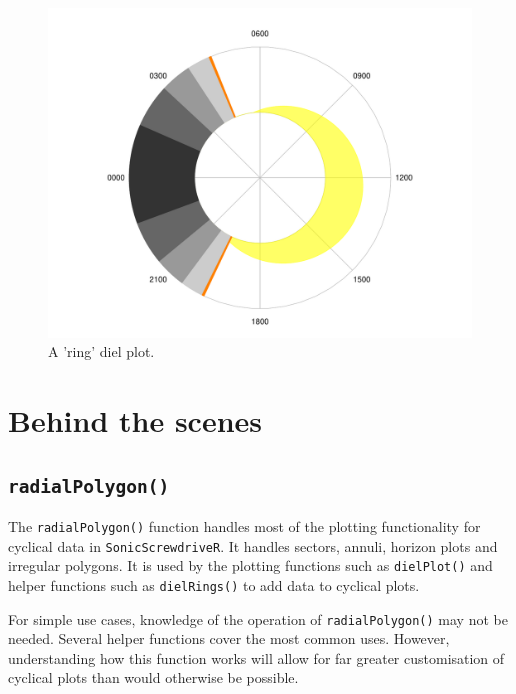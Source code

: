 \documentclass[
]{book}
\begin{document}
\begin{figure}

{\centering \includegraphics[width=0.9\linewidth]{_main_files/figure-latex/diel-plot-ring-1} 

}

\caption{A 'ring' diel plot.}\label{fig:diel-plot-ring}
\end{figure}

\hypertarget{behind-the-scenes}{%
\section{Behind the scenes}\label{behind-the-scenes}}

\hypertarget{radialpolygon}{%
\subsection{\texorpdfstring{\texttt{radialPolygon()}}{radialPolygon()}}\label{radialpolygon}}

The \texttt{radialPolygon()} function handles most of the plotting functionality for cyclical data in \texttt{SonicScrewdriveR}. It handles sectors, annuli, horizon plots and irregular polygons. It is used by the plotting functions such as \texttt{dielPlot()} and helper functions such as \texttt{dielRings()} to add data to cyclical plots.

For simple use cases, knowledge of the operation of \texttt{radialPolygon()} may not be needed. Several helper functions cover the most common uses. However, understanding how this function works will allow for far greater customisation of cyclical plots than would otherwise be possible.
\end{document}
